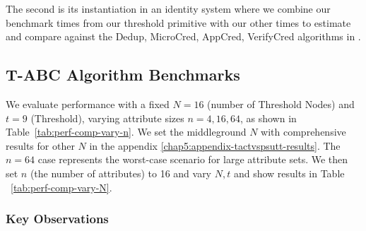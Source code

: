 The second is its instantiation in an identity system where we combine our benchmark times from our threshold primitive with our other times to estimate and compare against the Dedup, MicroCred, AppCred, VerifyCred algorithms in \cite{rabaninejad_attribute-based_2024}.

\subsection{T-ABC Algorithm Benchmarks}

We evaluate performance with a fixed $N = 16$ (number of Threshold Nodes) and $t = 9$ (Threshold), varying attribute sizes $n = 4, 16, 64$, as shown in Table~\ref{tab:perf-comp-vary-n}. We set the middleground $N$ with comprehensive results for other $N$ in the appendix \ref{chap5:appendix-tactvspsutt-results}. The $n = 64$ case represents the worst-case scenario for large attribute sets. We then set $n$ (the number of attributes) to 16 and vary $N, t$ and show results in Table ~\ref{tab:perf-comp-vary-N}.

\subsubsection{Key Observations}

